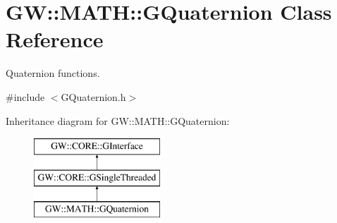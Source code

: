 \hypertarget{class_g_w_1_1_m_a_t_h_1_1_g_quaternion}{}\section{GW\+:\+:M\+A\+TH\+:\+:G\+Quaternion Class Reference}
\label{class_g_w_1_1_m_a_t_h_1_1_g_quaternion}


Quaternion functions.  




{\ttfamily \#include $<$G\+Quaternion.\+h$>$}

Inheritance diagram for GW\+:\+:M\+A\+TH\+:\+:G\+Quaternion\+:\begin{figure}[H]
\begin{center}
\leavevmode
\includegraphics[height=3.000000cm]{class_g_w_1_1_m_a_t_h_1_1_g_quaternion}
\end{center}
\end{figure}
